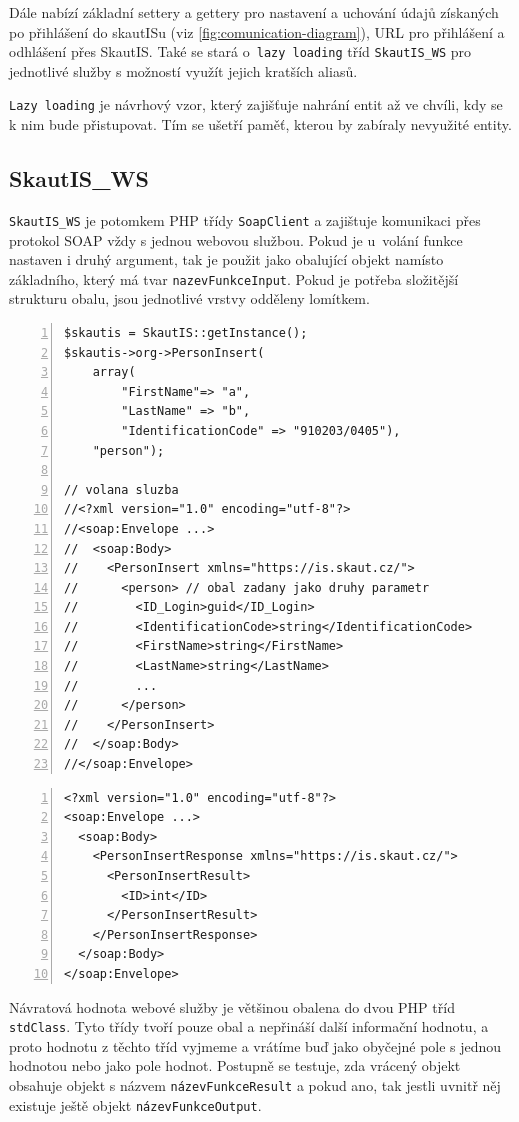 \documentclass[thesis=B,czech]{FITthesis}[2011/06/14]
\begin{document}
Dále nabízí základní settery a gettery pro nastavení a uchování údajů získaných po přihlášení do skautISu (viz \ref{fig:comunication-diagram}), URL pro přihlášení a odhlášení přes SkautIS. Také se stará o~\texttt{lazy loading} tříd \texttt{SkautIS\_WS} pro jednotlivé služby s možností využít jejich kratších aliasů.

\texttt{Lazy loading} je návrhový vzor, který zajišťuje nahrání entit až ve chvíli, kdy se k nim bude přistupovat. Tím se ušetří paměť, kterou by zabíraly nevyužité entity.     

\subsection{SkautIS\_WS}
\texttt{SkautIS\_WS} je potomkem PHP třídy \texttt{SoapClient} a zajištuje komunikaci přes protokol SOAP vždy s jednou webovou službou. Pokud je u~volání funkce nastaven i druhý argument, tak je použit jako obalující objekt namísto základního, který má tvar \texttt{nazevFunkceInput}. Pokud je potřeba složitější strukturu obalu, jsou jednotlivé vrstvy odděleny lomítkem.

\begin{lstlisting}[caption=volání webové služby s nestandardním obalem, label=SkautISAdvanceCover, numbers=left]
$skautis = SkautIS::getInstance();
$skautis->org->PersonInsert(
	array(
		"FirstName"=> "a",
		"LastName" => "b",
		"IdentificationCode" => "910203/0405"),
	"person");

// volana sluzba
//<?xml version="1.0" encoding="utf-8"?>
//<soap:Envelope ...>
//  <soap:Body>
//    <PersonInsert xmlns="https://is.skaut.cz/">
//      <person> // obal zadany jako druhy parametr
//        <ID_Login>guid</ID_Login>
//        <IdentificationCode>string</IdentificationCode>
//        <FirstName>string</FirstName>
//        <LastName>string</LastName>
//        ...
//      </person>
//    </PersonInsert>
//  </soap:Body>
//</soap:Envelope>	
\end{lstlisting}


\begin{lstlisting}[caption=návratová hodnota webové služby, numbers=left]
<?xml version="1.0" encoding="utf-8"?>
<soap:Envelope ...>
  <soap:Body>
    <PersonInsertResponse xmlns="https://is.skaut.cz/">
      <PersonInsertResult>
        <ID>int</ID>
      </PersonInsertResult>
    </PersonInsertResponse>
  </soap:Body>
</soap:Envelope>
\end{lstlisting}

Návratová hodnota webové služby je většinou obalena do dvou PHP tříd \texttt{stdClass}. Tyto třídy tvoří pouze obal a nepřináší další informační hodnotu, a proto hodnotu z těchto tříd vyjmeme a vrátíme buď jako obyčejné pole s jednou hodnotou nebo jako pole hodnot. Postupně se testuje, zda vrácený objekt obsahuje objekt s názvem \texttt{názevFunkceResult} a pokud ano, tak jestli uvnitř něj existuje ještě objekt \texttt{názevFunkceOutput}.
\end{document}
